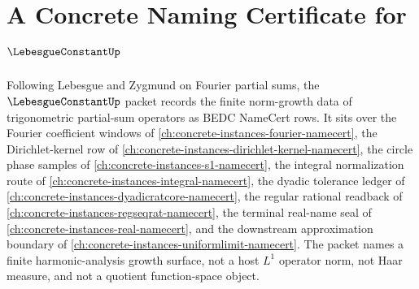 \chapter{A Concrete Naming Certificate for $\LebesgueConstantUp$}
\label{ch:concrete-instances-lebesgue-constant-namecert}

Following Lebesgue and Zygmund on Fourier partial sums, the $\LebesgueConstantUp$ packet records the finite norm-growth data of trigonometric partial-sum operators as BEDC NameCert rows. It sits over the Fourier coefficient windows of \autoref{ch:concrete-instances-fourier-namecert}, the Dirichlet-kernel row of \autoref{ch:concrete-instances-dirichlet-kernel-namecert}, the circle phase samples of \autoref{ch:concrete-instances-s1-namecert}, the integral normalization route of \autoref{ch:concrete-instances-integral-namecert}, the dyadic tolerance ledger of \autoref{ch:concrete-instances-dyadicratcore-namecert}, the regular rational readback of \autoref{ch:concrete-instances-regseqrat-namecert}, the terminal real-name seal of \autoref{ch:concrete-instances-real-namecert}, and the downstream approximation boundary of \autoref{ch:concrete-instances-uniformlimit-namecert}. The packet names a finite harmonic-analysis growth surface, not a host $L^{1}$ operator norm, not Haar measure, and not a quotient function-space object.

